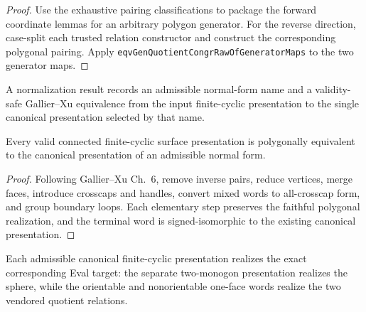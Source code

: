 \begin{proof}
\leanok
Use the exhaustive pairing classifications to package the forward coordinate
lemmas for an arbitrary polygon generator.  For the reverse direction,
case-split each trusted relation constructor and construct the corresponding
polygonal pairing.  Apply
\texttt{eqvGenQuotientCongrRawOfGeneratorMaps} to the two generator maps.
\end{proof}

\begin{definition}
\label{moise:def:normal_form_witness}
\leanok
{}
A normalization result records an admissible normal-form name and a
validity-safe Gallier--Xu equivalence from the input finite-cyclic presentation
to the single canonical presentation selected by that name.
\end{definition}

\begin{theorem}
\label{moise:thm:gx_normal_form}
\leanok
{}
Every valid connected finite-cyclic surface presentation is polygonally
equivalent to the canonical presentation of an admissible normal form.
\end{theorem}

\begin{proof}
\leanok
Following Gallier--Xu Ch.~6, remove inverse pairs, reduce vertices, merge
faces, introduce crosscaps and handles, convert mixed words to all-crosscap
form, and group boundary loops. Each elementary step preserves the faithful
polygonal realization, and the terminal word is signed-isomorphic to the
existing canonical presentation.
\end{proof}

\begin{lemma}
\label{moise:lem:canonical_endpoint_realizations}
\leanok
{}
Each admissible canonical finite-cyclic presentation realizes the exact
corresponding Eval target: the separate two-monogon presentation realizes the
sphere, while the orientable and nonorientable one-face words realize the two
vendored quotient relations.
\end{lemma}


